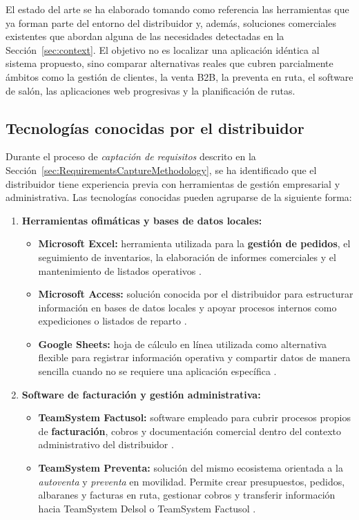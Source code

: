 El estado del arte se ha elaborado tomando como referencia las herramientas que ya forman parte del entorno del distribuidor y, además, soluciones comerciales existentes que abordan alguna de las necesidades detectadas en la Sección~\ref{sec:context}. El objetivo no es localizar una aplicación idéntica al sistema propuesto, sino comparar alternativas reales que cubren parcialmente ámbitos como la gestión de clientes, la venta B2B, la preventa en ruta, el software de salón, las aplicaciones web progresivas y la planificación de rutas.

\subsection{Tecnologías conocidas por el distribuidor}

Durante el proceso de \textit{captación de requisitos} descrito en la Sección~\ref{sec:RequirementsCaptureMethodology}, se ha identificado que el distribuidor tiene experiencia previa con herramientas de gestión empresarial y administrativa. Las tecnologías conocidas pueden agruparse de la siguiente forma:

\begin{enumerate}[label=\textbf{\arabic*.}, leftmargin=1.1cm, itemsep=0.45em, topsep=0.25em]
  \item \textbf{Herramientas ofimáticas y bases de datos locales:}
  \begin{itemize}[topsep=0.1em, itemsep=0.15em]
    \item \textbf{Microsoft Excel:} herramienta utilizada para la \textbf{gestión de pedidos}, el seguimiento de inventarios, la elaboración de informes comerciales y el mantenimiento de listados operativos \citep{microsoft-excel}.
    \item \textbf{Microsoft Access:} solución conocida por el distribuidor para estructurar información en bases de datos locales y apoyar procesos internos como expediciones o listados de reparto \citep{microsoft-access}.
    \item \textbf{Google Sheets:} hoja de cálculo en línea utilizada como alternativa flexible para registrar información operativa y compartir datos de manera sencilla cuando no se requiere una aplicación específica \citep{google-sheets}.
  \end{itemize}

  \item \textbf{Software de facturación y gestión administrativa:}
  \begin{itemize}[topsep=0.1em, itemsep=0.15em]
    \item \textbf{TeamSystem Factusol:} software empleado para cubrir procesos propios de \textbf{facturación}, cobros y documentación comercial dentro del contexto administrativo del distribuidor \citep{sdelsol-factusol}.
    \item \textbf{TeamSystem Preventa:} solución del mismo ecosistema orientada a la \textit{autoventa} y \textit{preventa} en movilidad. Permite crear presupuestos, pedidos, albaranes y facturas en ruta, gestionar cobros y transferir información hacia TeamSystem Delsol o TeamSystem Factusol \citep{sdelsol-preventa}.
  \end{itemize}
\end{enumerate}

